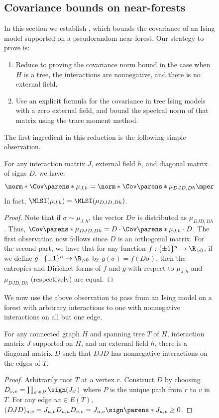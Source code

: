 \documentclass[11pt,letterpaper]{article}
\begin{document}
\begin{figure}
    \subsection{Covariance bounds on near-forests}\label{sec:covariance-near-forest}
    In this section we establish , which bounds the covariance of an Ising model supported on a pseudorandom near-forest.
    \nearforestcov*
    Our strategy to prove  is:
    \begin{enumerate}
        \item Reduce to proving the covariance norm bound in the case when $H$ is a tree, the interactions are nonnegative, and there is no external field.
        \item Use an explicit formula for the covariance in tree Ising models with a zero external field, and bound the spectral norm of that matrix using the trace moment method.
    \end{enumerate}
    The first ingredient in this reduction is the following simple observation.
    \begin{observation} \label{obs:sign-conjugation}
        For any interaction matrix $J$, external field $h$, and diagonal matrix of signs $D$, we have:
        \[
            \norm*{\Cov\parens*{\mu_{J,h}}} = \norm*{\Cov\parens*{\mu_{DJD, Dh}}}\mper
        \]
        In fact, $\MLSI(\mu_{J,h}) = \MLSI(\mu_{DJD,Dh})$.
    \end{observation}
    \begin{proof}
        Note that if $\sigma\sim\mu_{J,h}$, the vector $D\sigma$ is distributed as $\mu_{DJD,Dh}$.
        Thus, $\Cov\parens*{\mu_{DJD,Dh}} = D\cdot\Cov\parens*{\mu_{J,h}}\cdot D$. The first observation now follows since $D$ is an orthogonal matrix. For the second part, we have that for any function $f : \{\pm 1\}^n \to \R_{>0}$, if we define $g : \{\pm 1\}^n \to \R_{>0}$ by $g(\sigma) = f(D\sigma)$, then the entropies and Dirichlet forms of $f$ and $g$ with respect to $\mu_{J,h}$ and $\mu_{DJD,Dh}$ (respectively) are equal.
    \end{proof}

    We now use the above observation to pass from an Ising model on a forest with arbitrary interactions to one with nonnegative interactions on all but one edge. 
    \begin{lemma}   \label{lem:all-but-one-neg}
        For any connected graph $H$ and spanning tree $T$ of $H$, interaction matrix $J$ supported on $H$, and an external field $h$, there is a diagonal matrix $D$ such that $DJD$ has nonnegative interactions on the edges of $T$.
    \end{lemma}
    \begin{proof}
        Arbitrarily root $T$ at a vertex $r$.
        Construct $D$ by choosing $D_{v,v} = \prod_{e'\in P} \sign(J_{e'})$ where $P$ is the unique path from $r$ to $v$ in $T$.
        For any edge $uv\in E(T)$, $(DJD)_{u,v} = J_{u,v} D_{u,u} D_{v,v} = J_{u,v} \sign\parens*{J_{u,v}} \ge 0$.
    \end{proof}



\end{figure}
\end{document}
